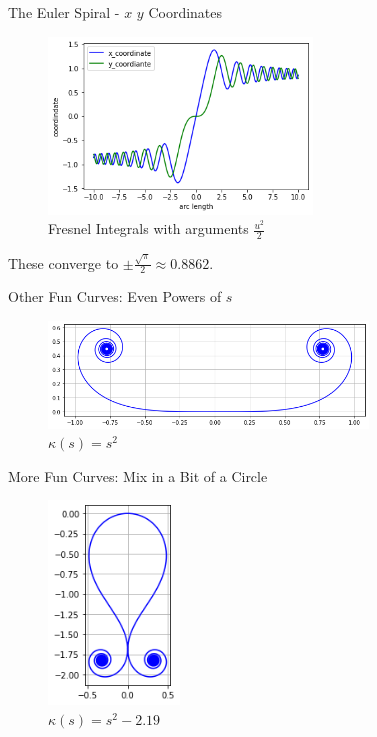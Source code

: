 \documentclass{beamer}
\begin{document}
\begin{frame}{The Euler Spiral - $x$ $y$ Coordinates}
	\begin{figure}
	\caption{Fresnel Integrals with arguments $\frac{u^2}{2}$}
	\centering
	\includegraphics[width=70mm, scale=0.5]{euler_x_vs_y.png}
	\end{figure}
	These converge to $\pm \frac{\sqrt{\pi}}{2} \approx 0.8862$.
\end{frame}

\begin{frame}{Other Fun Curves: Even Powers of $s$}
	\begin{figure}
		\caption{$\kappa(s) = s^2$}
		\centering
		\includegraphics[width=85mm, scale=0.5]{chaise_longue.png}
	\end{figure}
\end{frame}

\begin{frame}{More Fun Curves: Mix in a Bit of a Circle}
	\begin{figure}
		\caption{$\kappa(s) = s ^ 2 -2.19$}
		\centering
		\includegraphics[width=35mm, scale=0.2]{s_squared_minus_219.png}
	\end{figure}
\end{frame}
\end{document}
